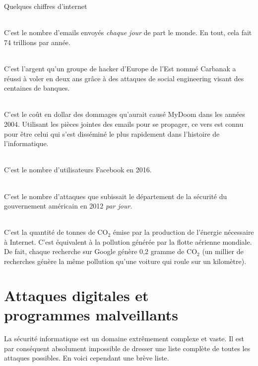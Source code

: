 \documentclass[article, french]{yReport}
\begin{document}
	\vfill
	\drawBackground\startBackground
	\begin{whole}
		{\color{mainColor}\huge{} Quelques chiffres d'internet}
		\begin{multicols}{2}
		\vspace*{0mm}\\[1mm]
		C'est le nombre d'emails envoyés \textit{chaque jour} de part le monde.
		En tout, cela fait 74 trillions par année.
		
		\vspace*{3mm}\\[1mm]
		C'est l'argent qu'un groupe de hacker d'Europe de l'Est nommé Carbanak a réussi à voler en deux ans grâce à des attaques de social engineering visant des centaines de banques.
		
		\vspace*{3mm}\\[1mm]
		C'est le coût en dollar des dommages qu'aurait causé MyDoom dans les années 2004.
		Utilisant les pièces jointes des emails pour se propager, ce vers est connu pour être celui qui s'est disséminé le plus rapidement dans l'histoire de l'informatique.
		
		\columnbreak
		\vspace*{0mm}\\[1mm]
		C'est le nombre d'utilisateurs Facebook en 2016.
		
		\vspace*{3mm}\\[1mm]
		C'est le nombre d'attaques que subissait le département de la sécurité du gouvernement américain en 2012 \textit{par jour}.
		
		\vspace*{3mm}\\[1mm]
		C'est la quantité de tonnes de $\mathrm{CO_2}$ émise par la production de l'énergie nécessaire à Internet.
		C'est équivalent à la pollution générée par la flotte aérienne mondiale.
		De fait, chaque recherche sur Google génère 0,2 gramme de $\mathrm{CO_2}$ (un millier de recherches génère la même pollution qu'une voiture qui roule sur un kilomètre).
		\end{multicols}
	\end{whole}
	\stopBackgroundPageBottom
	
	
	\appendices
	\renewcommand{\thesection}{\Alph{section}}
	\section[Types d'attaques informatiques]{Attaques digitales et\\programmes malveillants}
	\label{app:typeVirus}
	La sécurité informatique est un domaine extrêmement complexe et vaste.
	Il est par conséquent absolument impossible de dresser une liste complète de toutes les attaques possibles.
	En voici cependant une brève liste.
	
\end{document}
